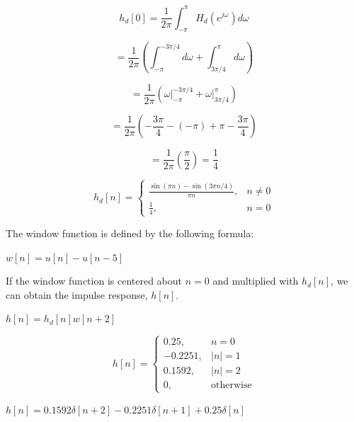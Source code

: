 \documentclass[fleqn]{article}
\begin{document}
\begin{enumerate}[nolistsep]
		\begin{equation*}
			h_d[0] = \frac{1}{2\pi}\int_{-\pi}^{\pi}{H_d(e^{j\omega})d\omega}
		\end{equation*}
		
		\begin{equation*}
			= \frac{1}{2\pi}\left(\int_{-\pi}^{-3\pi/4}{d\omega} + \int_{3\pi/4}^{\pi}{d\omega}\right)
		\end{equation*}
		
		\begin{equation*}
			= \frac{1}{2\pi}\left(\left.\omega\right\vert_{-\pi}^{-3\pi/4} + \left.\omega\right\vert_{3\pi/4}^{\pi}\right)
		\end{equation*}
		
		\begin{equation*}
			= \frac{1}{2\pi}\left(-\frac{3\pi}{4} - (-\pi) + \pi - \frac{3\pi}{4}\right)
		\end{equation*}
		
		\begin{equation*}
			= \frac{1}{2\pi}\left(\frac{\pi}{2}\right) = \frac{1}{4}
		\end{equation*}
		
		\begin{equation*}
			h_d[n] =
			\begin{cases}
				\frac{\sin{({\pi}n)} - \sin{(3{\pi}n/4)}}{{\pi}n}, & n \neq 0 \\
				\frac{1}{4}, & n = 0
			\end{cases}
		\end{equation*}
		
		The window function is defined by the following formula:
		
		$w[n] = u[n] - u[n - 5]$
		
		If the window function is centered about $n = 0$ and multiplied with $h_d[n]$, we can obtain the impulse response, $h[n]$.
		
		$h[n] = h_d[n]w[n + 2]$
		
		\begin{equation*}
			h[n] =
			\begin{cases}
				0.25, & n = 0 \\
				-0.2251, & |n| = 1 \\
				0.1592, & |n| = 2\\
				0, & \text{otherwise}
			\end{cases}
		\end{equation*}
		
		$h[n] = 0.1592\delta[n+2] - 0.2251\delta[n+1] + 0.25\delta[n]$
		

\end{enumerate}
\end{document}

